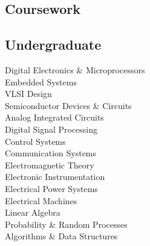 \documentclass[]{deedy}
\begin{document}
%
\pagebreak
%
\begin{minipage}[t]{0.25\textwidth} 
\begin{flushleft}
%
\section{Coursework}
%
\subsection{Undergraduate}
Digital Electronics \& Microprocessors \\
\vspace{1pt}
Embedded Systems \\
\vspace{1pt}
VLSI Design \\
\vspace{1pt}
Semiconductor Devices \& Circuits \\
\vspace{1pt}
Analog Integrated Circuits \\
\vspace{1pt}
Digital Signal Processing \\
\vspace{1pt}
Control Systems \\
\vspace{1pt}
Communication Systems \\
\vspace{1pt}
Electromagnetic Theory \\
\vspace{1pt}
Electronic Instrumentation \\
\vspace{1pt}
Electrical Power Systems \\
\vspace{1pt}
Electrical Machines \\
\vspace{1pt}
Linear Algebra \\
\vspace{1pt}
Probability \& Random Processes \\
\vspace{1pt}
Algorithms \& Data Structures
\sectionsep
%

\end{flushleft}
\end{minipage}
\end{document}
